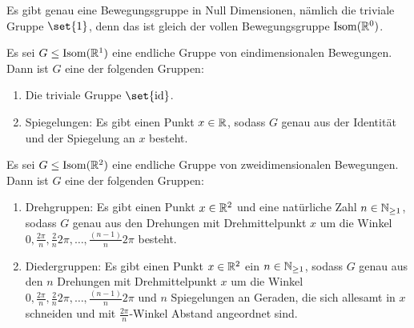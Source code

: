 Es gibt genau eine Bewegungsgruppe in Null Dimensionen, nämlich die triviale Gruppe $\set{1}$, denn das ist gleich der vollen Bewegungsgruppe $\operatorname{Isom}(\mathbb{R}^0)$.

\begin{theorem}[Dimension 1]
Es sei $G\leq\operatorname{Isom}(\mathbb{R}^1)$ eine endliche Gruppe von eindimensionalen Bewegungen. Dann ist $G$ eine der folgenden Gruppen:
\begin{enumerate}
\item Die triviale Gruppe $\set{\id}$.
\item Spiegelungen: Es gibt einen Punkt $x\in\mathbb{R}$, sodass $G$ genau aus der Identität und der Spiegelung an $x$ besteht.
\end{enumerate}
\end{theorem}

\begin{theorem}[Dimension 2]
Es sei $G\leq\operatorname{Isom}(\mathbb{R}^2)$ eine endliche Gruppe von zweidimensionalen Bewegungen. Dann ist $G$ eine der folgenden Gruppen:
\begin{enumerate}
\item Drehgruppen: Es gibt einen Punkt $x\in\mathbb{R}^2$ und eine natürliche Zahl $n\in\mathbb{N}_{\geq 1}$, sodass $G$ genau aus den Drehungen mit Drehmittelpunkt $x$ um die Winkel $0,\frac{2\pi}{n}, \frac{2}{n}2\pi, \ldots, \frac{(n-1)}{n}2\pi$ besteht.
\item Diedergruppen: Es gibt einen Punkt $x\in\mathbb{R}^2$ ein $n\in\mathbb{N}_{\geq 1}$, sodass $G$ genau aus den $n$ Drehungen mit Drehmittelpunkt $x$ um die Winkel $0,\frac{2\pi}{n}, \frac{2}{n}2\pi, \ldots, \frac{(n-1)}{n}2\pi$ und $n$ Spiegelungen an Geraden, die sich allesamt in $x$ schneiden und mit $\frac{2\pi}{n}$-Winkel Abstand angeordnet sind.
\end{enumerate}
\end{theorem}

